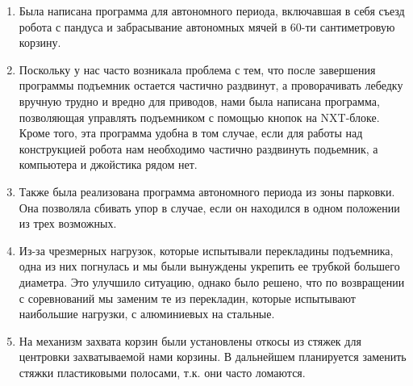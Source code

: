\begin{enumerate}
	\item Была написана программа для автономного периода, включавшая в себя съезд робота с пандуса и забрасывание автономных мячей в 60-ти сантиметровую корзину.
	
	\item Поскольку у нас часто возникала проблема с тем, что после завершения программы подъемник остается частично раздвинут, а проворачивать лебедку вручную трудно и вредно для приводов, нами была написана программа, позволяющая управлять подъемником с помощью кнопок на NXT-блоке. Кроме того, эта программа удобна в том случае, если для работы над конструкцией робота нам необходимо частично раздвинуть подьемник, а компьютера и джойстика рядом нет.
	
	\item Также была реализована программа автономного периода из зоны парковки. Она позволяла сбивать упор в случае, если он находился в одном положении из трех возможных.
	
	\item Из-за чрезмерных нагрузок, которые испытывали перекладины подъемника, одна из них погнулась и мы были вынуждены укрепить ее трубкой большего диаметра. Это улучшило ситуацию, однако было решено, что по возвращении с соревнований мы заменим те из перекладин, которые испытывают наибольшие нагрузки, с алюминиевых на стальные.
	
	
	\item На механизм захвата корзин были установлены откосы из стяжек для центровки захватываемой нами корзины. В дальнейшем планируется заменить стяжки  пластиковыми полосами, т.к. они часто ломаются.
	

\end{enumerate}
